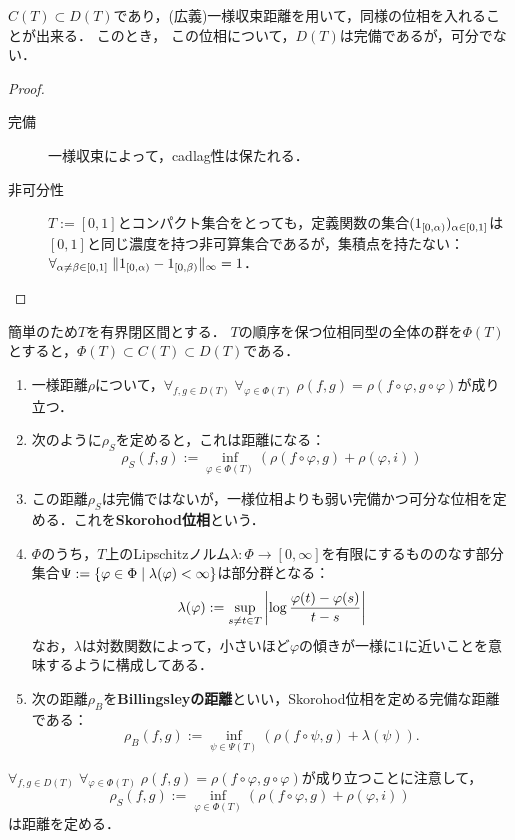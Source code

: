 \documentclass[uplatex,dvipdfmx]{jsreport}
\begin{document}
\begin{lemma}
    $C(T)\subset D(T)$であり，(広義)一様収束距離を用いて，同様の位相を入れることが出来る．
    このとき，
    この位相について，$D(T)$は完備であるが，可分でない．
\end{lemma}
\begin{proof}\mbox{}
    \begin{description}
        \item[完備] 一様収束によって，cadlag性は保たれる．
        \item[非可分性] $T:=[0,1]$とコンパクト集合をとっても，定義関数の集合$(1_{[0,\alpha)})_{\alpha\in[0,1]}$は$[0,1]$と同じ濃度を持つ非可算集合であるが，集積点を持たない：$\forall_{\alpha\ne\beta\in[0,1]}\;\|1_{[0,\alpha)}-1_{[0,\beta)}\|_\infty=1$．
    \end{description}
\end{proof}

\begin{definition}
    簡単のため$T$を有界閉区間とする．
    $T$の順序を保つ位相同型の全体の群を$\Phi(T)$とすると，$\Phi(T)\subset C(T)\subset D(T)$である．
    \begin{enumerate}
        \item 一様距離$\rho$について，$\forall_{f,g\in D(T)}\;\forall_{\varphi\in\Phi(T)}\;\rho(f,g)=\rho(f\circ\varphi,g\circ\varphi)$が成り立つ．
        \item 次のように$\rho_S$を定めると，これは距離になる：
        \[\rho_S(f,g):=\inf_{\varphi\in\Phi(T)}(\rho(f\circ\varphi,g)+\rho(\varphi,i))\]
        \item この距離$\rho_S$は完備ではないが，一様位相よりも弱い完備かつ可分な位相を定める．これを\textbf{Skorohod位相}という．
        \item $\Phi$のうち，$T$上のLipschitzノルム$\lambda:\Phi\to[0,\infty]$を有限にするもののなす部分集合$\Psi:=\left\{\varphi\in\Phi\mid\lambda(\varphi)<\infty\right\}$は部分群となる：
        \[\lambda(\varphi):=\sup_{s\ne t\in T}\left|\log\frac{\varphi(t)-\varphi(s)}{t-s}\right|\]
        なお，$\lambda$は対数関数によって，小さいほど$\varphi$の傾きが一様に$1$に近いことを意味するように構成してある．
        \item 次の距離$\rho_B$を\textbf{Billingsleyの距離}といい，Skorohod位相を定める完備な距離である：
        \[\rho_B(f,g):=\inf_{\psi\in\Psi(T)}(\rho(f\circ\psi,g)+\lambda(\psi)).\]
    \end{enumerate}
    $\forall_{f,g\in D(T)}\;\forall_{\varphi\in\Phi(T)}\;\rho(f,g)=\rho(f\circ\varphi,g\circ\varphi)$が成り立つことに注意して，
    \[\rho_S(f,g):=\inf_{\varphi\in\Phi(T)}(\rho(f\circ\varphi,g)+\rho(\varphi,i))\]
    は距離を定める．
\end{definition}
\end{document}

